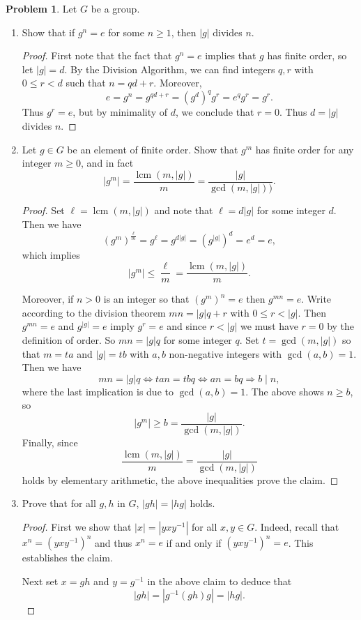 \documentclass[11pt]{article}
\DeclareMathOperator{\lcm}{lcm}
\theoremstyle{definition}
\newtheorem{problem}{Problem}
\begin{document}
\begin{problem} Let $G$ be a group.
 \begin{enumerate}
 \item Show that if $g^n=e$ for some $n \geq 1$, then $|g|$ divides $n$.
 

 \begin{proof}
	First note that the fact that $g^n = e$ implies that $g$ has finite order, so let $|g| = d$. By the Division Algorithm, we can find integers $q, r$ with $0 \leqslant r < d$ such that $n = qd+r$. Moreover,
	$$e = g^n = g^{qd+r} = (g^d)^qg^r = e^qg^r = g^r.$$
Thus $g^r = e$, but by minimality of $d$, we conclude that $r=0$. Thus $d = |g|$ divides $n$.
\end{proof}


\item Let $g \in G$ be an element of finite order. Show that $g^m$ has finite order for any integer $m \geq 0$, and in fact
\[
|g^m| = \frac{\lcm(m,|g|)}{m} = \frac{|g|}{\gcd(m, |g|))}.
\]

\begin{proof}
Set $\ell=\lcm(m,|g|)$ and note that $\ell=d|g|$ for some integer $d$. Then we have
\[
(g^m)^{\frac{\ell}{m}}=g^{\ell}=g^{d|g|}=\left(g^{|g|}\right)^{d}=e^{d}=e,
\]
which implies 
\[
|g^m| \leq \frac{\ell}{m}=\frac{\lcm(m,|g|)}{m}.
\]

Moreover, if $n>0$ is an integer so that $(g^m)^n=e$ then $g^{mn}=e$. Write according to the division theorem $mn=|g|q+r$ with $0\leq r<|g|$. Then $g^{mn}=e$ and $g^{|g|}=e$ imply $g^{r}=e$ and since $r<|g|$ we must have $r=0$ by the definition of order. So $mn= |g|q$ for some integer $q$.  Set $t=\gcd(m, |g|)$ so that $m=ta$ and $|g|=tb$ with $a,b$ non-negative integers with $\gcd(a,b)=1$. Then we have
\[
mn= |g|q \iff tan= tbq \iff an=bq \Rightarrow b\mid n,
\]
where the last implication is due to $\gcd(a,b)=1$. The above shows $n\geq b$, so
\[
|g^m| \geq b= \frac{|g|}{\gcd(m, |g|)}.
\]
Finally, since  \[\frac{\lcm(m,|g|)}{m} = \frac{|g|}{\gcd(m, |g|)}\] holds by elementary arithmetic, the above inequalities prove the claim.
\end{proof}


\item Prove that for all $g, h$ in  $G$, $|gh| = |hg|$ holds.

\begin{proof}
First we show that $|x|=|yxy^{-1}|$ for all $x,y\in G$. Indeed, recall that $x^n=(yxy^{-1})^n$ and thus $x^n=e$ if and only if $(yxy^{-1})^n=e$. This establishes the claim.

Next set $x=gh$ and $y=g^{-1}$ in the above claim to deduce that 
\[
|gh|=|g^{-1}(gh)g|=|hg|.
\]
\end{proof}
\end{enumerate}
\end{problem}
\end{document}
